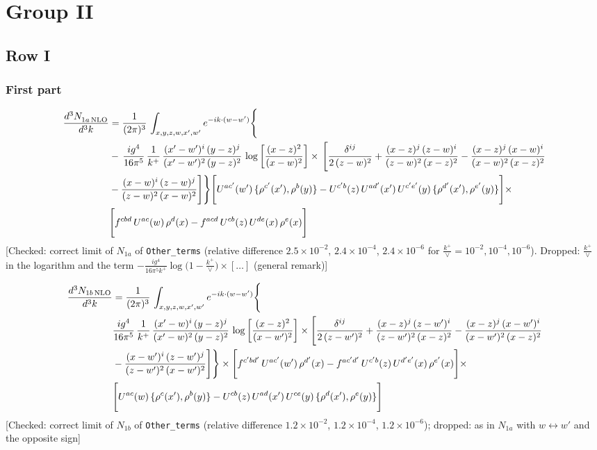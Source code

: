 \documentclass[9pt]{article}
\numberwithin{equation}{section}
\begin{document}
\section{Group II}
\subsection{Row I}
\subsubsection{First part}
\begin{align}
 \frac{d^{3}N_{1a\,\rm NLO}^{\rm}}{d^{3}k}  & =     \frac{1}{(2\pi)^{3}}\,\int_{x,y,z,w,x',w^{\prime}} e^{-ik\cdot (w-w')}\Bigg\{\notag \\
& -\, \frac{ig^{4}}{16\pi^{5}}\,\frac{1}{k^{+}}\, \frac{(x'-w')^{i}\,(y-z)^{j}}{(x'-w')^{2}\,(y-z)^{2}}\,\log{\left[\frac{(x-z)^{2}}{(x-w)^{2}}\right]}\times\,\Bigg[\frac{\delta^{ij}}{2\,(z-w)^{2}}+\frac{(x-z)^{j}\,(z-w)^{i}}{(z-w)^{2}\,(x-z)^{2}}-\frac{(x-z)^{j}\,(x-w)^{i}}{(x-w)^{2}\,(x-z)^{2}}\notag \\ & -\frac{(x-w)^{i}\,(z-w)^{j}}{(z-w)^{2}\,(x-w)^{2}}\Bigg]\Bigg\} \Bigg[U^{ac'}(w')\,\{\rho^{c'}(x'),\rho^{b}(y)\}-U^{c'b}(z)\,U^{ad'}(x')\,U^{c'e'}(y)\, \{\rho^{d'}(x'),\rho^{e'}(y)\}\Bigg]\times\notag \\ &  \Bigg[f^{cbd}\,U^{ac}(w)\,\rho^{d}(x)-f^{acd}\, U^{cb}(z)\,U^{de}(x)\,\rho^{e}(x)\Bigg]
\end{align} {\color{red}[Checked: correct limit of $N_{1a}$ of \texttt{Other\_terms} (relative difference $2.5\times10^{-2}$, $2.4\times10^{-4}$, $2.4\times10^{-6}$ for $\frac{k^{+}}{\vee}=10^{-2},10^{-4},10^{-6}$). Dropped: $\frac{k^{+}}{\vee}$ in the logarithm and the term $-\frac{ig^{4}}{16\pi^{5}k^{+}}\log\big(1-\frac{k^{+}}{\vee}\big)\times[\dots]$ (general remark)]}\par\noindent
\begin{align}
\frac{d^{3}N_{1b\, \rm NLO}}{d^{3}k} & =  \frac{1}{(2\pi)^{3}}\,\int_{x,y,z,w,x',w^{\prime}} e^{-ik\cdot (w-w')}\Bigg\{\notag \\
&  \frac{ig^{4}}{16\pi^{5}}\,\frac{1}{k^{+}}\, \frac{(x'-w)^{i}\,(y-z)^{j}}{(x'-w)^{2}\,(y-z)^{2}}\,\log{\left[\frac{(x-z)^{2}}{(x-w')^{2}}\right]}\times \Bigg[\frac{\delta^{ij}}{2\,(z-w')^{2}}+\frac{(x-z)^{j}\,(z-w')^{i}}{(z-w')^{2}\,(x-z)^{2}}-\frac{(x-z)^{j}\,(x-w')^{i}}{(x-w')^{2}\,(x-z)^{2}}\notag \\ & -\frac{(x-w')^{i}\,(z-w')^{j}}{(z-w')^{2}\,(x-w')^{2}}\Bigg]\Bigg\}  \times\Bigg[f^{c'bd'}\,U^{ac'}(w')\,\rho^{d'}(x)-f^{ac'd'}\, U^{c'b}(z)\,U^{d'e'}(x)\,\rho^{e'}(x)\Bigg] \times\notag \\ &  \Bigg[U^{ac}(w)\,\{\rho^{c}(x'),\rho^{b}(y)\}-U^{cb}(z)\,U^{ad}(x')\,U^{ce}(y)\, \{\rho^{d}(x'),\rho^{e}(y)\}\Bigg]
\end{align} {\color{red}[Checked: correct limit of $N_{1b}$ of \texttt{Other\_terms} (relative difference $1.2\times10^{-2}$, $1.2\times10^{-4}$, $1.2\times10^{-6}$); dropped: as in $N_{1a}$ with $w\leftrightarrow w'$ and the opposite sign]}\par\noindent
\end{document}
